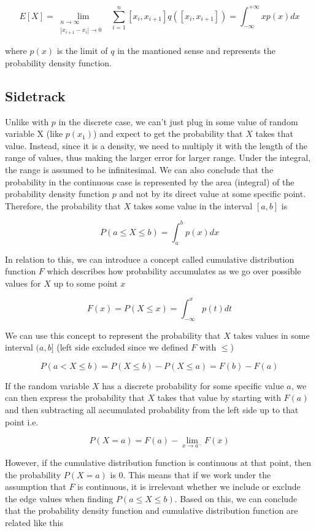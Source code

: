 \documentclass{article}
\begin{document}
\[ E[X] = \lim_{
    \begin{smallmatrix}
        n \to \infty & \\
        |x_{i+1}-x_i| \to 0
    \end{smallmatrix}}
    \sum_{i=1}^n [x_i, x_{i+1}]q([x_i, x_{i+1}]) = \int_{-\infty}^{+\infty} xp(x)dx \]

where $p(x)$ is the limit of $q$ in the mantioned sense and represents the probability density function.

\subsection{Sidetrack}

Unlike with $p$ in the discrete case, we can't just plug in some value of random variable X (like $p(x_1)$) and expect to get the probability that $X$ takes that value. Instead, since it is a density, we need to multiply it with the length of the range of values, thus making the larger error for larger range. Under the integral, the range is assumed to be infinitesimal. We can also conclude that the probability in the continuous case is represented by the area (integral) of the probability density function $p$ and not by its direct value at some specific point. Therefore, the probability that $X$ takes some value in the interval $[a, b]$ is

\[ P(a \leq X \leq b) = \int_a^b p(x)dx \]

In relation to this, we can introduce a concept called cumulative distribution function $F$ which describes how probability accumulates as we go over possible values for $X$ up to some point $x$

\[ F(x) = P(X \leq x) = \int_{-\infty}^{x} p(t)dt \]

We can use this concept to represent the probability that $X$ takes values in some interval $(a, b]$ (left side excluded since we defined $F$ with $\leq$)

\[ P(a < X \leq b) = P(X \leq b) - P(X \leq a) = F(b) - F(a) \]

If the random variable $X$ has a discrete probability for some specific value $a$, we can then express the probability that $X$ takes that value by starting with $F(a)$ and then subtracting all accumulated probability from the left side up to that point i.e.

\[ P(X = a) = F(a) - \lim_{x \to a^-} F(x) \]

However, if the cumulative distribution function is continuous at that point, then the probability $P(X = a)$ is 0. This means that if we work under the assumption that $F$ is continuous, it is irrelevant whether we include or exclude the edge values when finding $P(a \leq X \leq b)$. Based on this, we can conclude that the probability density function and cumulative distribution function are related like this
\end{document}
